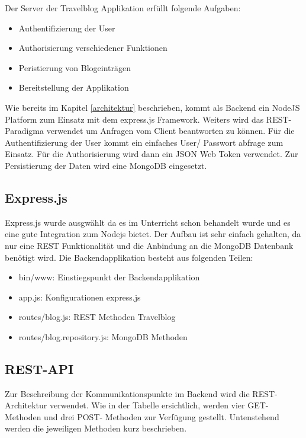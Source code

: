 \documentclass[../main.tex]{subfiles}
\begin{document}
Der Server der Travelblog Applikation erfüllt folgende Aufgaben:
\begin{itemize}
    \item Authentifizierung der User
    \item Authorisierung verschiedener Funktionen
    \item Peristierung von Blogeinträgen
    \item Bereitstellung der Applikation
\end{itemize}
Wie bereits im Kapitel \ref{architektur} beschrieben, kommt als Backend ein NodeJS Platform zum Einsatz mit dem express.js Framework. Weiters wird das REST- Paradigma verwendet um Anfragen vom Client beantworten zu können. Für die Authentifizierung der User kommt ein einfaches User/ Passwort abfrage zum Einsatz. Für die Authorisierung wird dann ein JSON Web Token verwendet. Zur Persistierung der Daten wird eine MongoDB eingesetzt.

\subsection{Express.js}
 Express.js wurde ausgwählt da es im Unterricht schon behandelt wurde und es eine gute Integration zum Nodejs bietet. Der Aufbau ist sehr einfach gehalten, da nur eine REST Funktionalität und die Anbindung an die MongoDB Datenbank benötigt wird. Die Backendapplikation besteht aus folgenden Teilen:
\begin{itemize}
    \item bin/www: Einstiegspunkt der Backendapplikation
    \item app.js: Konfigurationen express.js
    \item routes/blog.js: REST Methoden Travelblog
    \item routes/blog.repository.js: MongoDB Methoden
\end{itemize}

\subsection{REST-API}
Zur Beschreibung der Kommunikationspunkte im Backend wird die REST- Architektur verwendet. Wie in der Tabelle ersichtlich, werden vier GET- Methoden und drei POST- Methoden zur Verfügung gestellt. Untenstehend werden die jeweiligen Methoden kurz beschrieben.\\
\end{document}
